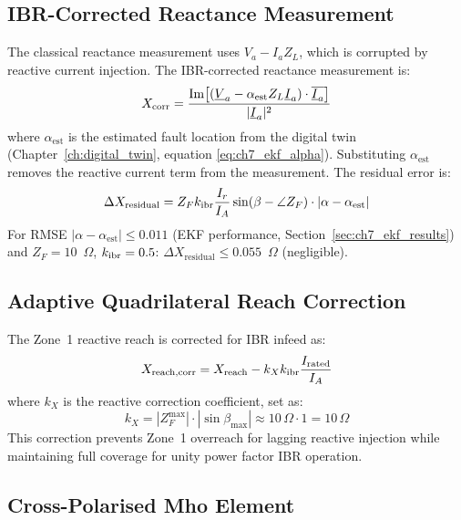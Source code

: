 \subsection{IBR-Corrected Reactance Measurement}

The classical reactance measurement uses $V_a - I_a Z_L$, which is
corrupted by reactive current injection. The IBR-corrected reactance
measurement is:
\begin{equation}
  X_\mathrm{corr} = \frac{\mathrm{Im}\!\left[(\underline{V}_a
    - \alpha_\mathrm{est} Z_L \underline{I}_a) \cdot
    \overline{\underline{I}_a}\right]}{|\underline{I}_a|^2}
  \label{eq:ch5_xcorr}
\end{equation}
where $\alpha_\mathrm{est}$ is the estimated fault location from the
digital twin (Chapter~\ref{ch:digital_twin}, equation \ref{eq:ch7_ekf_alpha}).
Substituting $\alpha_\mathrm{est}$ removes the reactive current term
from the measurement. The residual error is:
\begin{equation}
  \Delta X_\mathrm{residual} = Z_F k_\mathrm{ibr} \frac{I_r}{I_A}
    \sin(\beta - \angle Z_F) \cdot |\alpha - \alpha_\mathrm{est}|
  \label{eq:ch5_xcorr_error}
\end{equation}
For RMSE $|\alpha - \alpha_\mathrm{est}| \leq 0.011$ (EKF performance,
Section~\ref{sec:ch7_ekf_results}) and $Z_F = 10$~$\Omega$,
$k_\mathrm{ibr} = 0.5$: $\Delta X_\mathrm{residual} \leq 0.055$~$\Omega$ (negligible).

\subsection{Adaptive Quadrilateral Reach Correction}

The Zone~1 reactive reach is corrected for IBR infeed as:
\begin{equation}
  X_\mathrm{reach,corr} = X_\mathrm{reach} - k_X k_\mathrm{ibr} \frac{I_\mathrm{rated}}{I_A}
  \label{eq:ch5_xreach_corr}
\end{equation}
where $k_X$ is the reactive correction coefficient, set as:
\begin{equation}
  k_X = |Z_F^\mathrm{max}| \cdot |\sin\beta_\mathrm{max}|
  \approx 10\,\Omega \cdot 1 = 10\,\Omega
  \label{eq:ch5_kx}
\end{equation}
This correction prevents Zone~1 overreach for lagging reactive injection
while maintaining full coverage for unity power factor IBR operation.

\subsection{Cross-Polarised Mho Element}

